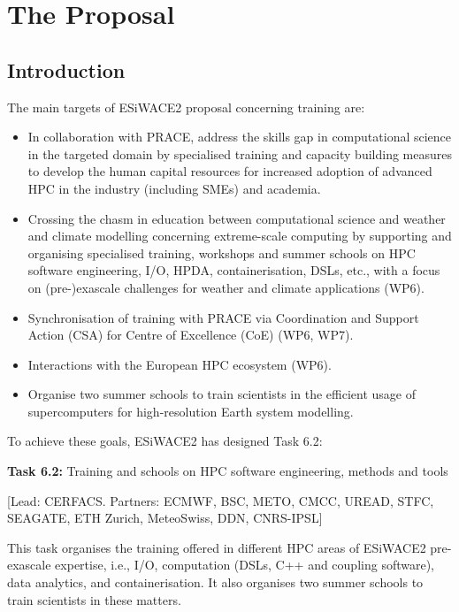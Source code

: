 \chapter{The Proposal}
\label{ch:prop}

\section{Introduction}

The main targets of ESiWACE2 proposal concerning training are:

\begin{itemize}

\item In collaboration with PRACE, address the skills gap in computational science in the targeted domain by specialised training and capacity building measures to develop the human capital resources for increased adoption of advanced HPC in the industry (including SMEs) and academia.

\item Crossing the chasm in education between computational science and weather and climate modelling concerning extreme-scale computing by supporting and organising specialised training, workshops and summer schools on HPC software engineering, I/O, HPDA, containerisation, DSLs, etc., with a focus on (pre-)exascale challenges for weather and climate applications (WP6).

\item Synchronisation of training with PRACE via Coordination and Support Action (CSA) for Centre of Excellence (CoE) (WP6, WP7).

\item Interactions with the European HPC ecosystem (WP6).

\item Organise two summer schools to train scientists in the efficient usage of supercomputers for high-resolution Earth system modelling.

\end{itemize}

To achieve these goals, ESiWACE2 has designed Task 6.2:

\textbf{Task 6.2:} Training and schools on HPC software engineering, methods and tools

[Lead: CERFACS. Partners: ECMWF, BSC, METO, CMCC, UREAD, STFC, SEAGATE, ETH Zurich, MeteoSwiss, DDN, CNRS-IPSL]

This task organises the training offered in different HPC areas of ESiWACE2 pre-exascale expertise, i.e., I/O, computation (DSLs, C++ and coupling software), data analytics, and containerisation. It also organises two summer schools to train scientists in these matters.

